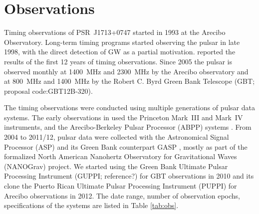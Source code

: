 \section{Observations}
Timing observations of PSR~J1713+0747 started in 1993 at the Arecibo
Observatory. Long-term timing programs started observing the pulsar in
late 1998, with the direct detection of GW as a partial
motivation. \citet{sns+05} reported the results of the first 12 years
of timing observations. Since 2005 the pulsar is observed monthly
at 1400~MHz and 2300~MHz by the Arecibo
observatory and at 800~MHz and 1400~MHz by the Robert C. Byrd Green Bank
Telescope (GBT; proposal code:GBT12B-320).

The timing observations were conducted 
using multiple generations of pulsar data systems. The early 
observations in \citet{sns+05} used
 the Princeton Mark~III \citep{skn+92} and Mark~IV
\citep{sst+00} instruments, and the Arecibo-Berkeley Pulsar Processor
(ABPP) systems \citep{bdz+97}. 
From 2004 to 2011/12, pulsar data were collected with the Astronomical Signal
Processor (ASP) and its Green Bank counterpart GASP \citep{dem07},
mostly as part of the formalized North American Nanohertz Observatory
for Gravitational Waves (NANOGrav) project. We
started using 
the Green Bank Ultimate Pulsar Processing Instrument (GUPPI; reference?) for GBT 
observations in 2010 and its clone the Puerto Rican Ultimate Pulsar Processing Instrument
(PUPPI) for Arecibo observations in 2012. 
The date range, number of observation epochs, specifications of the
systems are listed in Table \ref{tab:obs}.


